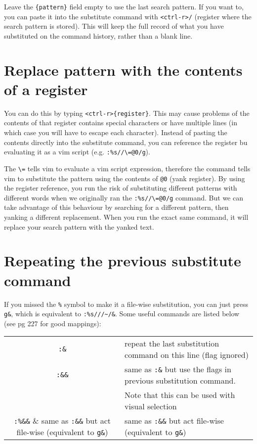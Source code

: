 Leave the \verb|{pattern}| field empty to use the last search pattern.
If you want to, you can paste it into the substitute command with \verb|<ctrl-r>/| (register where the search pattern is stored).
This will keep the full record of what you have substituted on the command history, rather than a blank line.

\section{Replace pattern with the contents of a register}

You can do this by typing \verb|<ctrl-r>{register}|.
This may cause problems of the contents of that register contains special characters or have multiple lines (in which case you will have to escape each character).
Instead of pasting the contents directly into the substitute command, you can reference the register bu evaluating it as a vim script (e.g. \verb|:%s//\=@0/g|).

The \verb|\=| tells vim to evaluate a vim script expression, therefore the command tells vim to substitute the pattern using the contents of \verb|@0| (yank register).
By using the  register reference, you run the risk of substituting different patterns with different words when we originally ran the \verb|:%s//\=@0/g| command.
But we can take advantage of this behaviour by searching for a different pattern, then yanking a different replacement.
When you run the exact same command, it will replace your search pattern with the yanked text.

\section{Repeating the previous substitute command}

If you missed the \verb|%| symbol to make it a file-wise substitution, you can just press \verb|g&|, which is equivalent to \verb|:%s///~/&|.
Some useful commands are listed below (see pg 227 for good mappings):
\newline

\begin{tabular}{c|l}
\verb|:&| & repeat the last substitution command on this line (flag ignored)\\
\verb|:&&| & same as \verb|:&| but use the flags in previous substitution command.\\
& Note that this can be used with visual selection\\
\verb|:%&&| & same as \verb|:&&| but act file-wise (equivalent to \verb|g&|)\\
\end{tabular}
